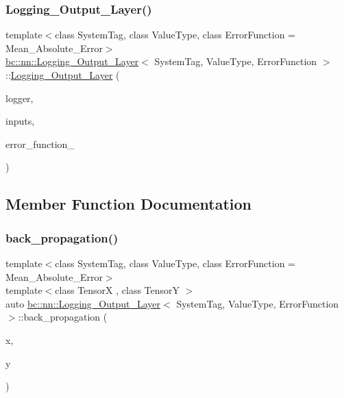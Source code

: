 \subsubsection{\texorpdfstring{Logging\+\_\+\+Output\+\_\+\+Layer()}{Logging\_Output\_Layer()}}
{\footnotesize\ttfamily template$<$class System\+Tag, class Value\+Type, class Error\+Function = Mean\+\_\+\+Absolute\+\_\+\+Error$>$ \\
\hyperlink{structbc_1_1nn_1_1Logging__Output__Layer}{bc\+::nn\+::\+Logging\+\_\+\+Output\+\_\+\+Layer}$<$ System\+Tag, Value\+Type, Error\+Function $>$\+::\hyperlink{structbc_1_1nn_1_1Logging__Output__Layer}{Logging\+\_\+\+Output\+\_\+\+Layer} (\begin{DoxyParamCaption}\item[{std\+::ostream \&}]{logger,  }\item[{\hyperlink{namespacebc_aaf8e3fbf99b04b1b57c4f80c6f55d3c5}{bc\+::size\+\_\+t}}]{inputs,  }\item[{Error\+Function}]{error\+\_\+function\+\_\+ }\end{DoxyParamCaption})\hspace{0.3cm}{\ttfamily [inline]}}



\subsection{Member Function Documentation}
\mbox{\label{structbc_1_1nn_1_1Logging__Output__Layer_aed0550f4b95ebea0fe4182d316cf58ef}} 
\subsubsection{\texorpdfstring{back\+\_\+propagation()}{back\_propagation()}}
{\footnotesize\ttfamily template$<$class System\+Tag, class Value\+Type, class Error\+Function = Mean\+\_\+\+Absolute\+\_\+\+Error$>$ \\
template$<$class TensorX , class TensorY $>$ \\
auto \hyperlink{structbc_1_1nn_1_1Logging__Output__Layer}{bc\+::nn\+::\+Logging\+\_\+\+Output\+\_\+\+Layer}$<$ System\+Tag, Value\+Type, Error\+Function $>$\+::back\+\_\+propagation (\begin{DoxyParamCaption}\item[{const TensorX \&}]{x,  }\item[{const TensorY \&}]{y }\end{DoxyParamCaption})\hspace{0.3cm}{\ttfamily [inline]}}

